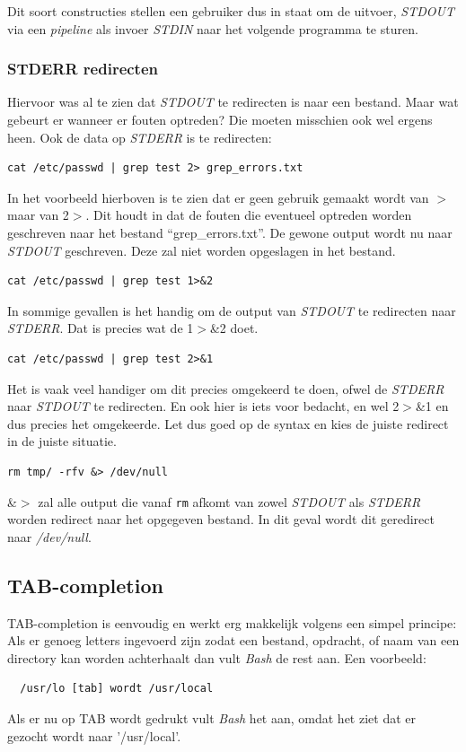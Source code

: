 Dit soort constructies stellen een gebruiker dus in staat om de uitvoer, \emph{STDOUT} via een \emph{pipeline} als invoer \emph{STDIN} naar het volgende programma te sturen. 

\subsubsection{STDERR redirecten}
Hiervoor was al te zien dat \emph{STDOUT} te redirecten is naar een bestand. Maar wat gebeurt er wanneer er fouten optreden? Die moeten misschien ook wel ergens heen. Ook de data op \emph{STDERR} is te redirecten: 
\begin{lstlisting}
cat /etc/passwd | grep test 2> grep_errors.txt
\end{lstlisting}
In het voorbeeld hierboven is te zien dat er geen gebruik gemaakt wordt van $>$ maar van 2$>$. Dit houdt in dat de fouten die eventueel optreden worden geschreven naar het bestand ``grep\_errors.txt''. De gewone output wordt nu naar \emph{STDOUT} geschreven. Deze zal niet worden opgeslagen in het bestand.

\begin{lstlisting}
cat /etc/passwd | grep test 1>&2 
\end{lstlisting}
In sommige gevallen is het handig om de output van \emph{STDOUT} te redirecten naar \emph{STDERR}. Dat is precies wat de 1$>$\&2 doet. 

\begin{lstlisting}
cat /etc/passwd | grep test 2>&1
\end{lstlisting}
Het is vaak veel handiger om dit precies omgekeerd te doen, ofwel de \emph{STDERR} naar \emph{STDOUT} te redirecten. En ook hier is iets voor bedacht, en wel 2$>$\&1 en dus precies het omgekeerde. Let dus goed op de syntax en kies de juiste redirect in de juiste situatie.

\begin{lstlisting}
rm tmp/ -rfv &> /dev/null
\end{lstlisting}
\&$>$ zal alle output die vanaf \texttt{rm} afkomt van zowel \emph{STDOUT} als \emph{STDERR} worden redirect naar het opgegeven bestand. In dit geval wordt dit geredirect naar \emph{/dev/null}.

\subsection{TAB-completion}
TAB-completion is eenvoudig en werkt erg makkelijk volgens een simpel principe:
Als er genoeg letters ingevoerd zijn zodat een bestand, opdracht, of naam van een directory kan worden achterhaalt dan vult \emph{Bash} de rest aan. Een voorbeeld:
\begin{lstlisting}
  /usr/lo [tab] wordt /usr/local
\end{lstlisting}
Als er nu op TAB wordt gedrukt vult \emph{Bash} het aan, omdat het ziet dat er gezocht wordt naar '/usr/local'.

